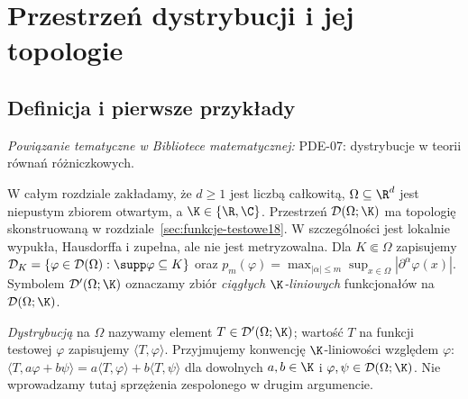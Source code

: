
\section{Przestrzeń dystrybucji i jej topologie}
\label{sec:dystrybucje19}

\providecommand{\atlasref}[2]{#2}


\subsection{Definicja i pierwsze przykłady}

\noindent\emph{Powiązanie tematyczne w Bibliotece matematycznej:} \atlasref{PDE-07::def:pde7-distribution}{PDE-07: dystrybucje w teorii równań różniczkowych}.


W całym rozdziale zakładamy, że $d\ge1$ jest liczbą całkowitą,
$\Omega\subseteq\R^d$ jest niepustym zbiorem otwartym,
a $\K\in\{\R,\C\}$.
Przestrzeń $\mathcal D(\Omega;\K)$ ma topologię skonstruowaną
w rozdziale~\ref{sec:funkcje-testowe18}. W szczególności
jest lokalnie wypukła, Hausdorffa i zupełna, ale nie jest
metryzowalna. Dla $K\Subset\Omega$ zapisujemy
$\mathcal D_K=\{\varphi\in\mathcal D(\Omega):\supp\varphi\subseteq K\}$
oraz $p_m(\varphi)=\max_{|\alpha|\le m}\sup_{x\in\Omega}
|\partial^\alpha\varphi(x)|$. Symbolem $\mathcal D'(\Omega;\K)$
oznaczamy zbiór \emph{ciągłych $\K$-liniowych} funkcjonałów
na $\mathcal D(\Omega;\K)$.

\begin{definicja}[Dystrybucja]
\label{def:distribution19}
\emph{Dystrybucją} na $\Omega$ nazywamy element
$T\in\mathcal D'(\Omega;\K)$; wartość $T$ na funkcji
testowej $\varphi$ zapisujemy $\langle T,\varphi\rangle$.
Przyjmujemy konwencję $\K$-liniowości względem $\varphi$:
$\langle T,a\varphi+b\psi\rangle=a\langle T,\varphi\rangle+
b\langle T,\psi\rangle$ dla dowolnych $a,b\in\K$
i $\varphi,\psi\in\mathcal D(\Omega;\K)$.
Nie wprowadzamy tutaj sprzężenia
zespolonego w drugim argumencie.
\end{definicja}

